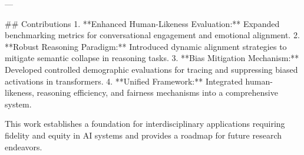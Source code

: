 ---

## Contributions  
1. **Enhanced Human-Likeness Evaluation:** Expanded benchmarking metrics for conversational engagement and emotional alignment.  
2. **Robust Reasoning Paradigm:** Introduced dynamic alignment strategies to mitigate semantic collapse in reasoning tasks.  
3. **Bias Mitigation Mechanism:** Developed controlled demographic evaluations for tracing and suppressing biased activations in transformers.  
4. **Unified Framework:** Integrated human-likeness, reasoning efficiency, and fairness mechanisms into a comprehensive system.  

This work establishes a foundation for interdisciplinary applications requiring fidelity and equity in AI systems and provides a roadmap for future research endeavors.